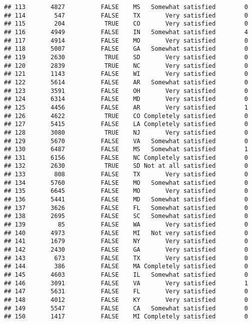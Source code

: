 \documentclass[]{book}
\theoremstyle{definition}
\theoremstyle{definition}
\theoremstyle{remark}
\begin{document}
\begin{verbatim}
## 113       4827          FALSE    MS   Somewhat satisfied        0
## 114        547          FALSE    TX       Very satisfied        0
## 115        204           TRUE    CO       Very satisfied        0
## 116       4949          FALSE    IN   Somewhat satisfied        4
## 117       4914          FALSE    MO       Very satisfied        0
## 118       5007          FALSE    GA   Somewhat satisfied        0
## 119       2630           TRUE    SD       Very satisfied        0
## 120       2839           TRUE    NC       Very satisfied        0
## 121       1143          FALSE    WI       Very satisfied        0
## 122       5614          FALSE    AR   Somewhat satisfied        0
## 123       3591          FALSE    OH       Very satisfied        0
## 124       6314          FALSE    MD       Very satisfied        0
## 125       4456          FALSE    AR       Very satisfied        1
## 126       4622           TRUE    CO Completely satisfied        0
## 127       5415          FALSE    LA Completely satisfied        0
## 128       3080           TRUE    NJ       Very satisfied        0
## 129       5670          FALSE    VA   Somewhat satisfied        0
## 130       6487          FALSE    MS   Somewhat satisfied        1
## 131       6156          FALSE    NC Completely satisfied        0
## 132       2630           TRUE    SD Not at all satisfied        0
## 133        808          FALSE    TX       Very satisfied        0
## 134       5760          FALSE    MO   Somewhat satisfied        0
## 135       6645          FALSE    MO       Very satisfied        0
## 136       5441          FALSE    MD   Somewhat satisfied        0
## 137       3626          FALSE    FL   Somewhat satisfied        0
## 138       2695          FALSE    SC   Somewhat satisfied        0
## 139         85          FALSE    WA       Very satisfied        0
## 140       4973          FALSE    MI   Not very satisfied        0
## 141       1679          FALSE    NY       Very satisfied        0
## 142       2430          FALSE    GA       Very satisfied        0
## 143        673          FALSE    TX       Very satisfied        0
## 144        386          FALSE    MA Completely satisfied        0
## 145       4603          FALSE    IL   Somewhat satisfied        0
## 146       3091          FALSE    VA       Very satisfied        1
## 147       5631          FALSE    FL       Very satisfied        0
## 148       4012          FALSE    KY       Very satisfied        0
## 149       5547          FALSE    CA   Somewhat satisfied        0
## 150       1417          FALSE    MI Completely satisfied        0

\end{verbatim}
\end{document}

